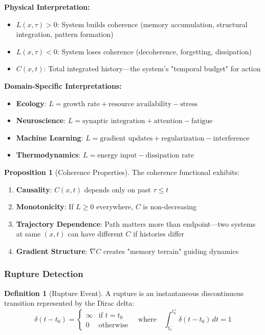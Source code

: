 \documentclass[11pt,a4paper]{article}
\theoremstyle{definition}
\newtheorem{definition}{Definition}[section]
\newtheorem{proposition}{Proposition}[section]
\theoremstyle{remark}
\begin{document}
\textbf{Physical Interpretation:}
\begin{itemize}
\item $L(x,\tau) > 0$: System builds coherence (memory accumulation, structural integration, pattern formation)
\item $L(x,\tau) < 0$: System loses coherence (decoherence, forgetting, dissipation)
\item $C(x,t)$: Total integrated history—the system's "temporal budget" for action
\end{itemize}

\textbf{Domain-Specific Interpretations:}
\begin{itemize}
\item \textbf{Ecology}: $L = \text{growth rate} + \text{resource availability} - \text{stress}$
\item \textbf{Neuroscience}: $L = \text{synaptic integration} + \text{attention} - \text{fatigue}$
\item \textbf{Machine Learning}: $L = \text{gradient updates} + \text{regularization} - \text{interference}$
\item \textbf{Thermodynamics}: $L = \text{energy input} - \text{dissipation rate}$
\end{itemize}

\begin{proposition}[Coherence Properties]
The coherence functional exhibits:
\begin{enumerate}
\item \textbf{Causality}: $C(x,t)$ depends only on past $\tau \leq t$
\item \textbf{Monotonicity}: If $L \geq 0$ everywhere, $C$ is non-decreasing
\item \textbf{Trajectory Dependence}: Path matters more than endpoint—two systems at same $(x,t)$ can have different $C$ if histories differ
\item \textbf{Gradient Structure}: $\nabla C$ creates "memory terrain" guiding dynamics
\end{enumerate}
\end{proposition}

\subsubsection{Rupture Detection}

\begin{definition}[Rupture Event]
A rupture is an instantaneous discontinuous transition represented by the Dirac delta:
\begin{equation}
\delta(t-t_0) =
\begin{cases}
\infty & \text{if } t = t_0 \\
0 & \text{otherwise}
\end{cases}
\quad \text{where} \quad \int_{t_0^-}^{t_0^+} \delta(t-t_0)\,dt = 1
\label{eq:rupture}
\end{equation}
\end{definition}
\end{document}
